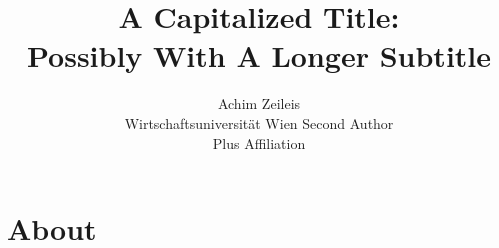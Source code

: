 \documentclass[codesnippet]{jss}
\author{Achim Zeileis\\Wirtschaftsuniversit\"at Wien \And 
        Second Author\\Plus Affiliation}
\title{A Capitalized Title:\\ Possibly With A Longer Subtitle}
\begin{document}

\section[About Java]{About }
\end{document}
